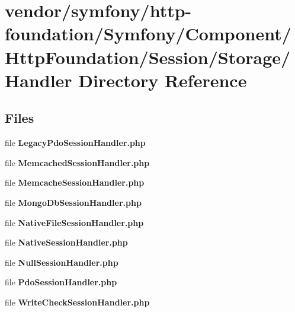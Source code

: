 \section{vendor/symfony/http-\/foundation/\+Symfony/\+Component/\+Http\+Foundation/\+Session/\+Storage/\+Handler Directory Reference}
\label{dir_15a2b94e8630f9b5aea31f9f0c0fd2d1}
\subsection*{Files}
\begin{DoxyCompactItemize}
\item 
file {\bf Legacy\+Pdo\+Session\+Handler.\+php}
\item 
file {\bf Memcached\+Session\+Handler.\+php}
\item 
file {\bf Memcache\+Session\+Handler.\+php}
\item 
file {\bf Mongo\+Db\+Session\+Handler.\+php}
\item 
file {\bf Native\+File\+Session\+Handler.\+php}
\item 
file {\bf Native\+Session\+Handler.\+php}
\item 
file {\bf Null\+Session\+Handler.\+php}
\item 
file {\bf Pdo\+Session\+Handler.\+php}
\item 
file {\bf Write\+Check\+Session\+Handler.\+php}
\end{DoxyCompactItemize}
